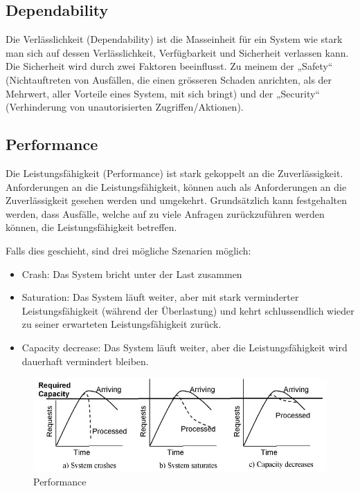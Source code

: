 \subsection*{Dependability}

Die Verlässlichkeit (Dependability) ist die Masseinheit für ein System wie stark man sich auf dessen Verlässlichkeit, Verfügbarkeit und Sicherheit verlassen kann. Die Sicherheit wird durch zwei Faktoren beeinflusst. Zu meinem der „Safety“ (Nichtauftreten von Ausfällen, die einen grösseren Schaden anrichten, als der Mehrwert, aller Vorteile eines System, mit sich bringt) und der „Security“ (Verhinderung von unautorisierten Zugriffen/Aktionen).

\subsection*{Performance}

Die Leistungsfähigkeit (Performance) ist stark gekoppelt an die Zuverlässigkeit. Anforderungen an die Leistungsfähigkeit, können auch als Anforderungen an die Zuverlässigkeit gesehen werden und umgekehrt. Grundsätzlich kann festgehalten werden, dass Ausfälle, welche auf zu viele Anfragen zurückzuführen werden können, die Leistungsfähigkeit betreffen.

Falls dies geschieht, sind drei mögliche Szenarien möglich:

\begin{itemize}
	\item Crash: Das System bricht unter der Last zusammen
	\item Saturation: Das System läuft weiter, aber mit stark verminderter Leistungsfähigkeit (während der Überlastung) und kehrt schlussendlich wieder zu seiner erwarteten Leistungsfähigkeit zurück.
	\item Capacity decrease: Das System läuft weiter, aber die Leistungsfähigkeit wird dauerhaft vermindert bleiben.
\end{itemize}

\begin{figure}[H]
	\centering
	\includegraphics[width=\textwidth]{content/faulttolerance/images/performance.jpg}
	\caption{Performance}
\end{figure}